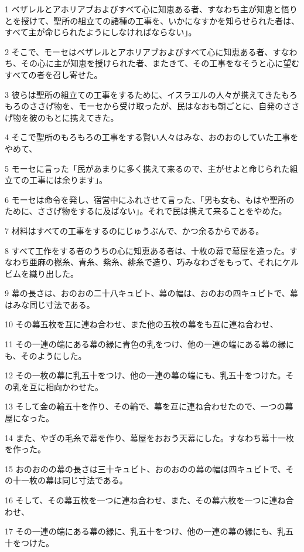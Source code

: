 \par 1 ベザレルとアホリアブおよびすべて心に知恵ある者、すなわち主が知恵と悟りとを授けて、聖所の組立ての諸種の工事を、いかになすかを知らせられた者は、すべて主が命じられたようにしなければならない」。
\par 2 そこで、モーセはベザレルとアホリアブおよびすべて心に知恵ある者、すなわち、その心に主が知恵を授けられた者、またきて、その工事をなそうと心に望むすべての者を召し寄せた。
\par 3 彼らは聖所の組立ての工事をするために、イスラエルの人々が携えてきたもろもろのささげ物を、モーセから受け取ったが、民はなおも朝ごとに、自発のささげ物を彼のもとに携えてきた。
\par 4 そこで聖所のもろもろの工事をする賢い人々はみな、おのおのしていた工事をやめて、
\par 5 モーセに言った「民があまりに多く携えて来るので、主がせよと命じられた組立ての工事には余ります」。
\par 6 モーセは命令を発し、宿営中にふれさせて言った、「男も女も、もはや聖所のために、ささげ物をするに及ばない」。それで民は携えて来ることをやめた。
\par 7 材料はすべての工事をするのにじゅうぶんで、かつ余るからである。
\par 8 すべて工作をする者のうちの心に知恵ある者は、十枚の幕で幕屋を造った。すなわち亜麻の撚糸、青糸、紫糸、緋糸で造り、巧みなわざをもって、それにケルビムを織り出した。
\par 9 幕の長さは、おのおの二十八キュビト、幕の幅は、おのおの四キュビトで、幕はみな同じ寸法である。
\par 10 その幕五枚を互に連ね合わせ、また他の五枚の幕をも互に連ね合わせ、
\par 11 その一連の端にある幕の縁に青色の乳をつけ、他の一連の端にある幕の縁にも、そのようにした。
\par 12 その一枚の幕に乳五十をつけ、他の一連の幕の端にも、乳五十をつけた。その乳を互に相向かわせた。
\par 13 そして金の輪五十を作り、その輪で、幕を互に連ね合わせたので、一つの幕屋になった。
\par 14 また、やぎの毛糸で幕を作り、幕屋をおおう天幕にした。すなわち幕十一枚を作った。
\par 15 おのおのの幕の長さは三十キュビト、おのおのの幕の幅は四キュビトで、その十一枚の幕は同じ寸法である。
\par 16 そして、その幕五枚を一つに連ね合わせ、また、その幕六枚を一つに連ね合わせ、
\par 17 その一連の端にある幕の縁に、乳五十をつけ、他の一連の幕の縁にも、乳五十をつけた。
